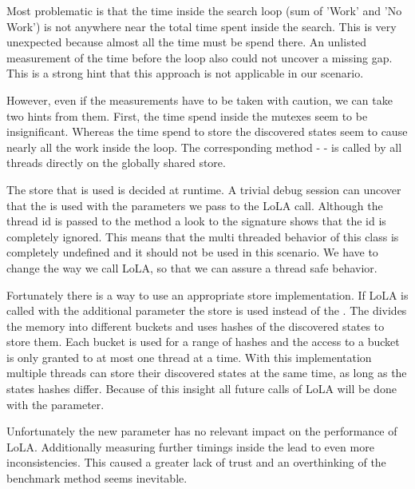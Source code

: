 Most problematic is that the time inside the search loop (sum of 'Work' and 'No Work') is not anywhere near the total time spent inside the search. This is very unexpected because almost all the time must be spend there. An unlisted measurement of the time before the loop also could not uncover a missing gap. This is a strong hint that this approach is not applicable in our scenario.

However, even if the measurements have to be taken with caution, we can take two hints from them. First, the time spend inside the mutexes seem to be insignificant. Whereas the time spend to store the discovered states seem to cause nearly all the work inside the loop. The corresponding method -  - is called by all threads directly on the globally shared store.

The store that is used is decided at runtime. A trivial debug session can uncover that the  is used with the parameters we pass to the LoLA call. Although the thread id is passed to the method a look to the signature  shows that the id is completely ignored. This means that the multi threaded behavior of this class is completely undefined and it should not be used in this scenario. We have to change the way we call LoLA, so that we can assure a thread safe behavior.

Fortunately there is a way to use an appropriate store implementation. If LoLA is called with the additional parameter  the  store is used instead of the . The  divides the memory into different buckets and uses hashes of the discovered states to store them. Each bucket is used for a range of hashes and the access to a bucket is only granted to at most one thread at a time. With this implementation multiple threads can store their discovered states at the same time, as long as the states hashes differ. Because of this insight all future calls of LoLA will be done with the  parameter.

Unfortunately the new parameter has no relevant impact on the performance of LoLA. Additionally measuring further timings inside the  lead to even more inconsistencies. This caused a greater lack of trust and an overthinking of the benchmark method seems inevitable.

